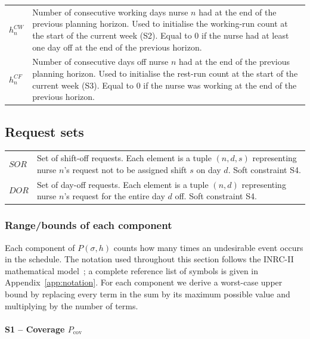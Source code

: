 \documentclass[11pt]{article}
\begin{document}
\begin{tabular}{@{}lp{10cm}@{}}
  $h^{CW}_n$ &
    Number of consecutive working days nurse $n$ had at the end of
    the previous planning horizon. Used to initialise the working-run
    count at the start of the current week (S2). Equal to $0$ if the
    nurse had at least one day off at the end of the previous
    horizon. \\[6pt]

  $h^{CF}_n$ &
    Number of consecutive days off nurse $n$ had at the end of the
    previous planning horizon. Used to initialise the rest-run count
    at the start of the current week (S3). Equal to $0$ if the nurse
    was working at the end of the previous horizon. \\
\end{tabular}

\subsection*{Request sets}

\begin{tabular}{@{}lp{10cm}@{}}
  $\mathit{SOR}$ &
    Set of shift-off requests. Each element is a tuple $(n, d, s)$
    representing nurse $n$'s request not to be assigned shift $s$ on
    day $d$. Soft constraint S4. \\[6pt]

  $\mathit{DOR}$ &
    Set of day-off requests. Each element is a tuple $(n, d)$
    representing nurse $n$'s request for the entire day $d$ off.
    Soft constraint S4. \\
\end{tabular}

\subsubsection{Range/bounds of each component}
Each component of $P(\sigma, h)$ counts how many times an undesirable
event occurs in the schedule. The notation used throughout this section
follows the INRC-II mathematical model~\cite{ceschia2015inrc2}; a
complete reference list of symbols is given in
Appendix~\ref{app:notation}. For each component we derive a worst-case
upper bound by replacing every term in the sum by its maximum possible
value and multiplying by the number of terms.

\paragraph{S1 -- Coverage $P_{\text{cov}}$}
\end{document}
